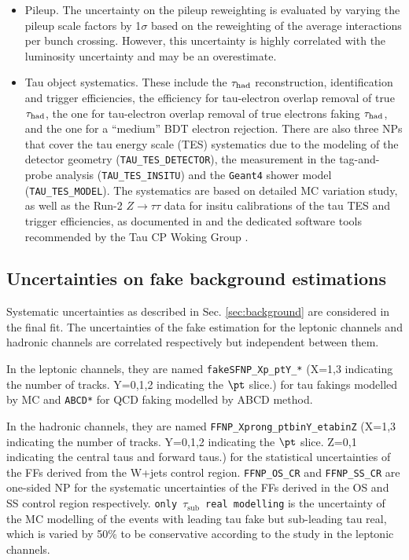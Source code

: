 \begin{itemize}
\item Pileup. The uncertainty on the pileup reweighting is evaluated by varying the pileup scale factors by 1$\sigma$ based on the reweighting of the average interactions per bunch crossing. However, this uncertainty is highly correlated with the luminosity uncertainty and may be an overestimate.
\item Tau object systematics. These include the $\tau_\text{had}$ reconstruction, identification and trigger efficiencies, the efficiency for tau-electron overlap removal of true $\tau_\text{had}$, the one for tau-electron overlap removal of true electrons faking $\tau_\text{had}$, and the one for a ``medium'' BDT electron rejection. There are also three NPs that cover the tau energy scale (TES) systematics due to the modeling of the detector geometry (\texttt{TAU\_TES\_DETECTOR}), the measurement in the tag-and-probe analysis (\texttt{TAU\_TES\_INSITU}) and the \texttt{Geant4} shower model (\texttt{TAU\_TES\_MODEL}). The systematics are based on detailed MC variation study, as well as the Run-2 $Z\to\tau\tau$ data for insitu calibrations of the tau TES and trigger efficiencies, as documented in \cite{tau_sys1} and the dedicated software tools \cite{tau_sys2} recommended by the Tau CP Woking Group \cite{TauCP}.
\end{itemize}

\subsection{Uncertainties on fake background estimations}
\label{sec:syst_datadriven}

Systematic uncertainties as described in Sec. \ref{sec:background} are considered in the final fit. The uncertainties of the fake estimation for the leptonic channels and hadronic channels are correlated respectively but independent between them.

In the leptonic channels, they are named \texttt{fakeSFNP\_Xp\_ptY\_*} (X=1,3 indicating the number of tracks. Y=0,1,2 indicating the $\pt$ slice.) for tau fakings modelled by MC and \texttt{ABCD*} for QCD faking modelled by ABCD method.

In the hadronic channels, they are named \texttt{FFNP\_Xprong\_ptbinY\_etabinZ} (X=1,3 indicating the number of tracks. Y=0,1,2 indicating the $\pt$ slice. Z=0,1 indicating the central taus and forward taus.) for the statistical uncertainties of the FFs derived from the W+jets control region. \texttt{FFNP\_OS\_CR} and \texttt{FFNP\_SS\_CR} are one-sided NP for the systematic uncertainties of the FFs derived in the OS and SS control region respectively. \texttt{only $\tau_\mathrm{sub}$ real modelling} is the uncertainty of the MC modelling of the events with leading tau fake but sub-leading tau real, which is varied by 50\% to be conservative according to the study in the leptonic channels.

